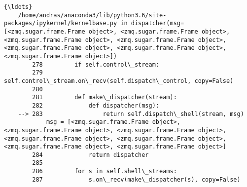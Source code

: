 \documentclass[11pt]{article}
\begin{document}
\begin{Verbatim}[commandchars=\\\{\}]
    {\ldots}
    /home/andras/anaconda3/lib/python3.6/site-packages/ipykernel/kernelbase.py in dispatcher(msg=[<zmq.sugar.frame.Frame object>, <zmq.sugar.frame.Frame object>, <zmq.sugar.frame.Frame object>, <zmq.sugar.frame.Frame object>, <zmq.sugar.frame.Frame object>, <zmq.sugar.frame.Frame object>, <zmq.sugar.frame.Frame object>])
        278         if self.control\_stream:
        279             self.control\_stream.on\_recv(self.dispatch\_control, copy=False)
        280 
        281         def make\_dispatcher(stream):
        282             def dispatcher(msg):
    --> 283                 return self.dispatch\_shell(stream, msg)
            msg = [<zmq.sugar.frame.Frame object>, <zmq.sugar.frame.Frame object>, <zmq.sugar.frame.Frame object>, <zmq.sugar.frame.Frame object>, <zmq.sugar.frame.Frame object>, <zmq.sugar.frame.Frame object>, <zmq.sugar.frame.Frame object>]
        284             return dispatcher
        285 
        286         for s in self.shell\_streams:
        287             s.on\_recv(make\_dispatcher(s), copy=False)
    

\end{Verbatim}
\end{document}
